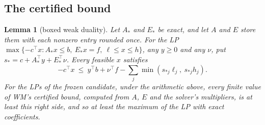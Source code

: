 \documentclass[11pt,a4paper]{article}
\newtheorem{alemma}{Lemma}[section]
\begin{document}
\subsection{The certified bound}

\begin{alemma}[boxed weak duality]\label{lem:L1}
Let $A_\ast$ and $E_\ast$ be exact, and let $A$ and $E$ store them with each nonzero entry rounded once. For the LP
$\max\{-c^\top x : A_\ast x\le b,\ E_\ast x = f,\ \ell\le x\le h\}$, any $y\ge0$ and any $\nu$, put
$s_\ast = c + A_\ast^\top y + E_\ast^\top\nu$. Every feasible $x$ satisfies
\[
-c^\top x\ \le\ y^\top b + \nu^\top f - \textstyle\sum_j \min(s_{\ast j}\ell_j,\ s_{\ast j}h_j).
\]
For the LPs of the frozen candidate, under the arithmetic above, every finite value of WM's certified bound, computed
from $A$, $E$ and the solver's multipliers, is at least this right side, and so at least the maximum of the LP with
exact coefficients.
\end{alemma}
\end{document}
